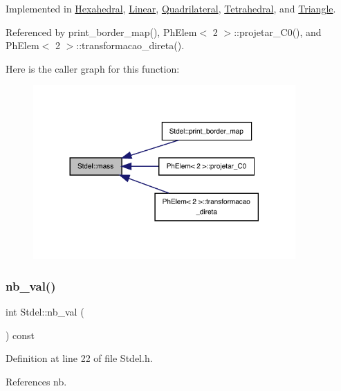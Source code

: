 Implemented in \hyperlink{classHexahedral_a8a25a3772962f7cb6d2f8c6b6871c0d1}{Hexahedral}, \hyperlink{classLinear_aed8640c00d187985b5303c257323ed91}{Linear}, \hyperlink{classQuadrilateral_a63ff83a9100d597f694d76b3d5f147a5}{Quadrilateral}, \hyperlink{classTetrahedral_a0ac27c7dabcc007ef5a2acaa3cfe789d}{Tetrahedral}, and \hyperlink{classTriangle_a6728c6239f7edbf04da7246cf0ee0c8c}{Triangle}.



Referenced by print\+\_\+border\+\_\+map(), Ph\+Elem$<$ 2 $>$\+::projetar\+\_\+\+C0(), and Ph\+Elem$<$ 2 $>$\+::transformacao\+\_\+direta().

Here is the caller graph for this function\+:
\nopagebreak
\begin{figure}[H]
\begin{center}
\leavevmode
\includegraphics[width=284pt]{classStdel_ab475cc8bc82a3b8a5200d4d841ef0a51_icgraph}
\end{center}
\end{figure}
\mbox{\label{classStdel_a4fb0a049dc27d8e67665a56d1b5a18ba}} 
\subsubsection{\texorpdfstring{nb\+\_\+val()}{nb\_val()}}
{\footnotesize\ttfamily int Stdel\+::nb\+\_\+val (\begin{DoxyParamCaption}{ }\end{DoxyParamCaption}) const\hspace{0.3cm}{\ttfamily [inline]}}



Definition at line 22 of file Stdel.\+h.



References nb.



